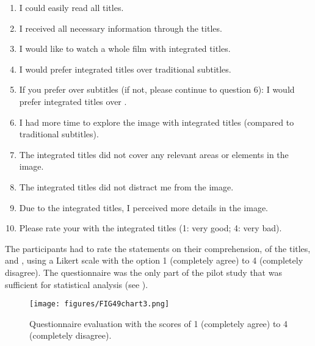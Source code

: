 \begin{enumerate}
\item I could easily read all titles.
\item I received all necessary information through the titles.
\item I would like to watch a whole film with integrated titles.
\item I would prefer integrated titles over traditional subtitles.
\item If you prefer  over subtitles (if not, please continue to question 6): I would prefer integrated titles over .
\item I had more time to explore the image with integrated titles (compared to traditional subtitles).
\item The integrated titles did not cover any relevant areas or elements in the image.
\item The integrated titles did not distract me from the image.
\item Due to the integrated titles, I perceived more details in the image.
\item Please rate your  with the integrated titles (1: very good; 4: very bad).
\end{enumerate}

The participants had to rate the statements on their comprehension,  of the titles, and , using a Likert scale with the option 1 (completely agree) to 4 (completely disagree). The questionnaire was the only part of the pilot study that was sufficient for statistical analysis (see ).

\begin{figure} 
\texttt{[image: figures/FIG49chart3.png]}
\caption{Questionnaire evaluation with the scores of 1 (completely agree) to 4 (completely disagree).}
\label{fig:FIG49chart3}
\end{figure}

